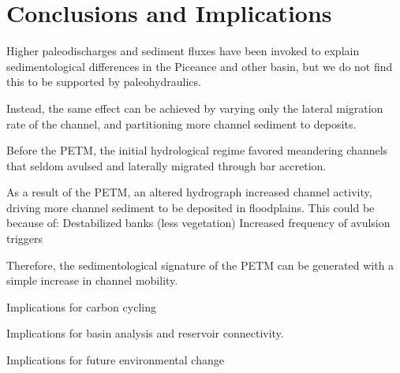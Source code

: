\documentclass[draft]{compact_proposal}
\begin{document}
\section{Conclusions and Implications}


Higher paleodischarges and sediment fluxes have been invoked to explain sedimentological differences in the Piceance and other basin, but we do not find this to be supported by paleohydraulics.

Instead, the same effect can be achieved by varying only the lateral migration rate of the channel, and partitioning more channel sediment to deposits.

Before the PETM, the initial hydrological regime favored meandering channels that seldom avulsed and laterally migrated through bar accretion.

As a result of the PETM, an altered hydrograph increased channel activity, driving more channel sediment to be deposited in floodplains. This could be because of:
    Destabilized banks (less vegetation)
    Increased frequency of avulsion triggers

Therefore, the sedimentological signature of the PETM can be generated with a simple increase in channel mobility.

Implications for carbon cycling

Implications for basin analysis and reservoir connectivity.

Implications for future environmental change


\printbibliography
\end{document}
